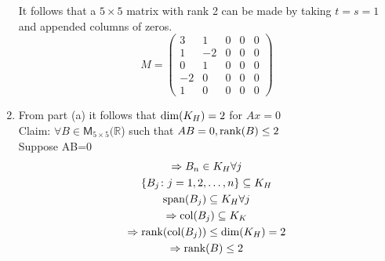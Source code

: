 \begin{enumerate}
It follows that a $5\times 5$ matrix with rank 2 can be made by taking
$t=s=1$ and appended columns of zeros.
\begin{equation}
M = \begin{pmatrix}
3 & 1 & 0 & 0 & 0\\
1 & -2 & 0 & 0 & 0\\
0 & 1& 0 & 0 & 0\\
-2 & 0 & 0 & 0 &0\\
1 & 0 & 0 &0 &0 
\end{pmatrix}
\end{equation}
\newpage{}
\item From part (a) it follows that $\text{dim}({K_H}) = 2$ for $Ax=0$
\\Claim: $\forall B \in \mathsf{M}_{5\times 5}(\mathbb{R}$) such that
$AB=0, \text{rank}({B})\leq 2$
\\Suppose AB=0
\begin{gather}
\Rightarrow B_n\in K_H \forall j\\
\{B_j\colon j=1,2,\dotsc,n\}\subseteq K_H\\
\text{span}(B_j) \subseteq K_H \forall j\\
\Rightarrow \text{col}(B_j)\subseteq K_K\\
\Rightarrow \text{rank}({\text{col}(B_j)}) \leq \text{dim}({K_H})=2\\
\Rightarrow \text{rank}({B})\leq 2
\end{gather}
\end{enumerate}
